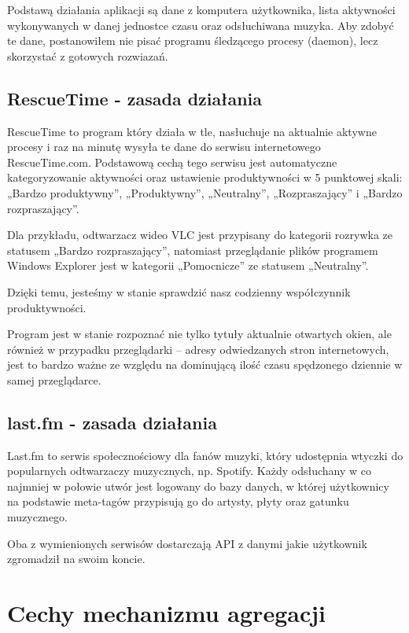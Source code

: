 \documentclass[brudnopis]{xmgr}
\begin{document}
    Podstawą działania aplikacji są dane z komputera użytkownika,
    lista aktywności wykonywanych w danej jednostce czasu oraz odsłuchiwana muzyka.
    Aby zdobyć te dane, postanowiłem nie pisać programu śledzącego procesy (daemon),
    lecz skorzystać z gotowych rozwiazań.

        \subsection{RescueTime - zasada działania}

        RescueTime to program który działa w tle, nasłuchuje na aktualnie aktywne procesy
        i raz na minutę wysyła te dane do serwisu internetowego RescueTime.com.
        Podstawową cechą tego serwisu jest automatyczne kategoryzowanie aktywności oraz ustawienie produktywności w 5 punktowej skali:
        „Bardzo produktywny”, „Produktywny”, „Neutralny”, „Rozpraszający” i „Bardzo rozpraszający”.

        Dla przykładu, odtwarzacz wideo VLC jest przypisany do kategorii rozrywka ze statusem „Bardzo rozpraszający”,
        natomiast przeglądanie plików programem Windows Explorer jest w kategorii „Pomocnicze” ze statusem „Neutralny”.

        Dzięki temu, jesteśmy w stanie sprawdzić nasz codzienny współczynnik produktywności.

        Program jest w stanie rozpoznać nie tylko tytuły aktualnie otwartych okien,
        ale również w przypadku przeglądarki – adresy odwiedzanych stron internetowych,
        jest to bardzo ważne ze względu na dominującą ilość czasu spędzonego dziennie w samej przeglądarce.

        \subsection{last.fm - zasada działania}

        Last.fm to serwis społecznościowy dla fanów muzyki,
        który udostępnia wtyczki do popularnych odtwarzaczy muzycznych, np. Spotify.
        Każdy odsłuchany w co najmniej w połowie utwór jest logowany do bazy danych,
        w której użytkownicy na podstawie meta-tagów przypisują go do artysty, płyty oraz gatunku muzycznego.

        Oba z wymienionych serwisów dostarczają API z danymi jakie użytkownik zgromadził na swoim koncie.


    \section{Cechy mechanizmu agregacji}
\end{document}
